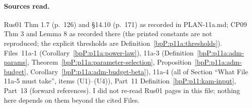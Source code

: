 \paragraph{Sources read.} Rus01 Thm 1.7 (p.~126) and \S14.10 (p.~171) as recorded in PLAN-11a.md; CP09 Thm 3 and Lemma 8 as recorded there (the printed constants are not reproduced; the explicit thresholds are Definition~\ref{bpP:p11a:thresholds}). Files~11a-1 (Corollary~\ref{bpP:p11a:power-law}), 11a-3 (Definition~\ref{bpP:p11a:adm-params}, Theorem~\ref{bpP:p11a:parameter-selection}, Proposition~\ref{bpP:p11a:adm-budget}, Corollary~\ref{bpP:p11a:adm-budget-beta}), 11a-4 (all of Section ``What File 11a-5 must take'', items (U1)--(U4)), Part~11 Definition~\ref{bpP:p11:kam-input}, Part~13 (forward references). I did not re-read Rus01 pages in this file; nothing here depends on them beyond the cited Files.

